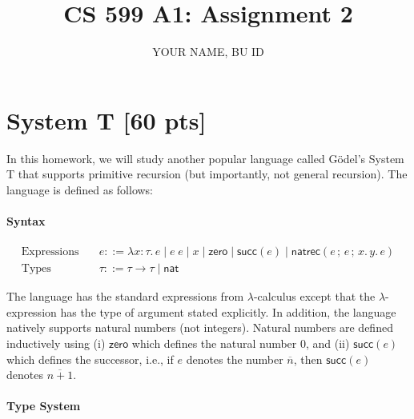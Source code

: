 \documentclass{article}
\title{CS 599 A1: Assignment 2}
\author{YOUR NAME, BU ID}
\date{}
\newcommand{\lc}{$\lambda$-calculus}
\newcommand{\m}[1]{\mathsf{#1}}
\newcommand{\elam}[2]{\lambda{#1}.\,{#2}}
\newcommand{\eapp}[2]{#1 \; #2}
\newcommand{\num}[1]{\overline{#1}}
\newcommand{\G}{\Gamma}
\newcommand{\zero}{\m{zero}}
\renewcommand{\succ}[1]{\m{succ}(#1)}
\newcommand{\semi}{\,;\,}
\newcommand{\natrec}[5]{\m{natrec}(#1 \semi #2 \semi #3.\, #4. \, #5)}
\newcommand{\tnat}{\m{nat}}
\begin{document}
\maketitle

\section{System T [60 pts]}
In this homework, we will study another popular language called G\"{o}del's System T that supports primitive recursion
(but importantly, not general recursion). The language is defined as follows:

\paragraph*{Syntax}
\begin{align*}
    \text{Expressions} \quad & e ::= \elam{x : \tau}{e} \mid \eapp{e}{e} \mid x \mid \zero \mid \succ{e} \mid \natrec{e}{e}{x}{y}{e} \\
    \text{Types} \quad & \tau ::= \tau \rightarrow \tau \mid \tnat
\end{align*}

The language has the standard expressions from \lc{} except that the $\lambda$-expression has the type of argument
stated explicitly.
In addition, the language natively supports natural numbers (not integers).
Natural numbers are defined inductively using (i) $\zero$ which defines the natural number $0$, and (ii) $\succ{e}$ which defines the
successor, i.e., if $e$ denotes the number $\num{n}$, then $\succ{e}$ denotes $\num{n+1}$.

\paragraph*{Type System}
\end{document}
